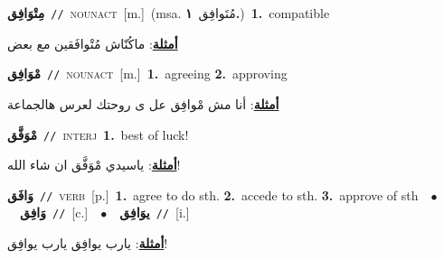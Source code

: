 \documentclass[10pt,a4paper,twoside]{article} %
\begin{document}
\begin{multicols}{2}
{\setlength\topsep{0pt}\textbf{\foreignlanguage{arabic}{مِتْوَافِق}}\ {\color{gray}\texttt{//}\color{black}}\ \textsc{noun\textunderscore act}\ [m.]\ \color{gray}(msa. \foreignlanguage{arabic}{مُتَوافِق}~\foreignlanguage{arabic}{\textbf{١.}})\color{black}\ \textbf{1.}~compatible\  \begin{flushright}\color{gray}\foreignlanguage{arabic}{\textbf{\underline{\foreignlanguage{arabic}{أمثلة}}}: ماكُنّاش مُتْوافَقين مع بعض}\end{flushright}\color{black}} \vspace{2mm}

{\setlength\topsep{0pt}\textbf{\foreignlanguage{arabic}{مْوَافِق}}\ {\color{gray}\texttt{//}\color{black}}\ \textsc{noun\textunderscore act}\ [m.]\ \textbf{1.}~agreeing  \textbf{2.}~approving\  \begin{flushright}\color{gray}\foreignlanguage{arabic}{\textbf{\underline{\foreignlanguage{arabic}{أمثلة}}}: أنا مش مْوافِق عل ى روحتك لعرس هالجماعة}\end{flushright}\color{black}} \vspace{2mm}

{\setlength\topsep{0pt}\textbf{\foreignlanguage{arabic}{مْوَفَّق}}\ {\color{gray}\texttt{//}\color{black}}\ \textsc{interj}\ \textbf{1.}~best of luck!\  \begin{flushright}\color{gray}\foreignlanguage{arabic}{\textbf{\underline{\foreignlanguage{arabic}{أمثلة}}}: ياسيدي مْوَفَّق ان شاء الله!}\end{flushright}\color{black}} \vspace{2mm}

{\setlength\topsep{0pt}\textbf{\foreignlanguage{arabic}{وَافَق}}\ {\color{gray}\texttt{//}\color{black}}\ \textsc{verb}\ [p.]\ \textbf{1.}~agree to do sth.  \textbf{2.}~accede to sth.  \textbf{3.}~approve of sth\ \ $\bullet$\ \ \setlength\topsep{0pt}\textbf{\foreignlanguage{arabic}{وَافِق}}\ {\color{gray}\texttt{//}\color{black}}\ [c.]\ \ $\bullet$\ \ \setlength\topsep{0pt}\textbf{\foreignlanguage{arabic}{يوَافِق}}\ {\color{gray}\texttt{//}\color{black}}\ [i.]\  \begin{flushright}\color{gray}\foreignlanguage{arabic}{\textbf{\underline{\foreignlanguage{arabic}{أمثلة}}}: يارب يوافِق يارب يوافِق!}\end{flushright}\color{black}} \vspace{2mm}


\end{multicols}
\end{document}
